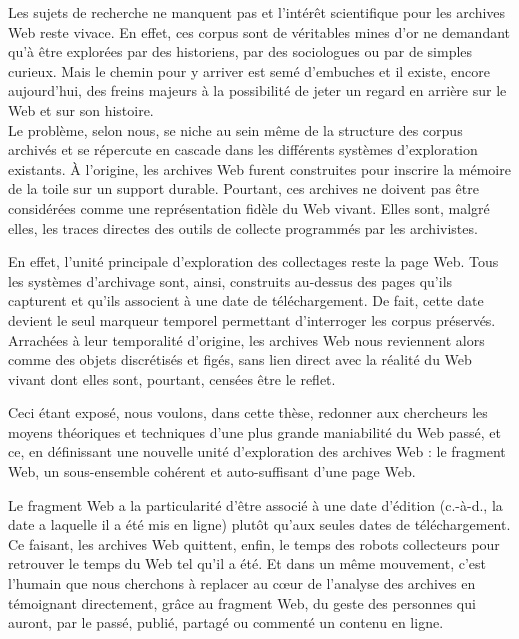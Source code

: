 \documentclass[symmetric,justified,marginals=raggedouter]{tufte-book}
\begin{document}
Les sujets de recherche ne manquent pas et l'intérêt scientifique pour les archives Web reste vivace. En effet, ces corpus sont de véritables mines d'or ne demandant qu'à être explorées par des historiens, par des sociologues ou par de simples curieux. Mais le chemin pour y arriver est semé d'embuches et il existe, encore aujourd'hui, des freins majeurs à la possibilité de jeter un regard en arrière sur le Web et sur son histoire.\\

\noindent Le problème, selon nous, se niche au sein même de la structure des corpus archivés et se répercute en cascade dans les différents systèmes d'exploration existants. À l'origine, les archives Web furent construites pour inscrire la mémoire de la toile sur un support durable. Pourtant, ces archives ne doivent pas être considérées comme une représentation fidèle du Web vivant. Elles sont, malgré elles, les traces directes des outils de collecte programmés par les archivistes. 

En effet, l'unité principale d'exploration des collectages reste la page Web. Tous les systèmes d'archivage sont, ainsi, construits au-dessus des pages qu'ils capturent et qu'ils associent à une date de téléchargement. De fait, cette date devient le seul marqueur temporel permettant d'interroger les corpus préservés. Arrachées à leur temporalité d'origine, les archives Web nous reviennent alors comme des objets discrétisés et figés, sans lien direct avec la réalité du Web vivant dont elles sont, pourtant, censées être le reflet.

Ceci étant exposé, nous voulons, dans cette thèse, redonner aux chercheurs les moyens théoriques et techniques d'une plus grande maniabilité du Web passé, et ce, en définissant une nouvelle unité d'exploration des archives Web : le fragment Web, un sous-ensemble cohérent et auto-suffisant d'une page Web. 

Le fragment Web a la particularité d'être associé à une date d'édition (c.-à-d., la date a laquelle il a été mis en ligne) plutôt qu'aux seules dates de téléchargement. Ce faisant, les archives Web quittent, enfin, le temps des robots collecteurs pour retrouver le temps du Web tel qu'il a été. Et dans un même mouvement, c'est l'humain que nous cherchons à replacer au cœur de l'analyse des archives en témoignant directement, grâce au fragment Web, du geste des personnes qui auront, par le passé, publié, partagé ou commenté un contenu en ligne.   
\end{document}
